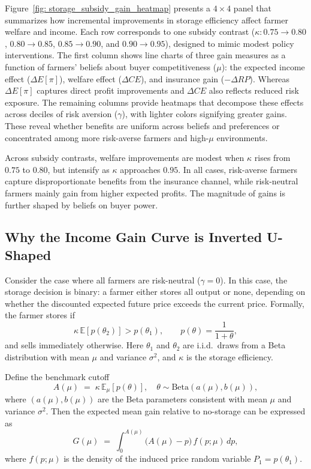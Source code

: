 Figure~\ref{fig: storage_subsidy_gain_heatmap} presents a $4 \times 4$ panel that summarizes how incremental improvements in storage efficiency affect farmer welfare and income. Each row corresponds to one subsidy contrast ($\kappa: 0.75 \rightarrow 0.80$, $0.80 \rightarrow 0.85$, $0.85 \rightarrow 0.90$, and $0.90 \rightarrow 0.95$), designed to mimic modest policy interventions. The first column shows line charts of three gain measures as a function of farmers’ beliefs about buyer competitiveness ($\mu$): the expected income effect ($\Delta E[\pi]$), welfare effect ($\Delta CE$), and insurance gain ($-\Delta RP$). Whereas $\Delta E[\pi]$ captures direct profit improvements and $\Delta CE$ also reflects reduced risk exposure. The remaining columns provide heatmaps that decompose these effects across deciles of risk aversion ($\gamma$), with lighter colors signifying greater gains. These reveal whether benefits are uniform across beliefs and preferences or concentrated among more risk-averse farmers and high-$\mu$ environments.

Across subsidy contrasts, welfare improvements are modest when $\kappa$ rises from $0.75$ to $0.80$, but intensify as $\kappa$ approaches $0.95$. In all cases, risk-averse farmers capture disproportionate benefits from the insurance channel, while risk-neutral farmers mainly gain from higher expected profits. The magnitude of gains is further shaped by beliefs on buyer power. 




\subsection{Why the Income Gain Curve is Inverted U-Shaped}
\noindent
Consider the case where all farmers are risk-neutral ($\gamma=0$). In this case, the storage decision is binary: a farmer either stores all output or none, depending on whether the discounted expected future price exceeds the current price. Formally, the farmer stores if
\[
\kappa\,\mathbb{E}[p(\theta_2)] > p(\theta_1), \qquad p(\theta)=\frac{1}{1+\theta},
\]
and sells immediately otherwise. Here $\theta_1$ and $\theta_2$ are i.i.d.\ draws from a Beta distribution with mean $\mu$ and variance $\sigma^2$, and $\kappa$ is the storage efficiency.

Define the benchmark cutoff
\[
A(\mu) \;=\; \kappa\,\mathbb{E}_{\mu}[p(\theta)], \quad \theta\sim\text{Beta}(a(\mu),b(\mu)),
\]
where $(a(\mu),b(\mu))$ are the Beta parameters consistent with mean $\mu$ and variance $\sigma^2$. Then the expected mean gain relative to no-storage can be expressed as
\[
G(\mu) \;=\; \int_{0}^{A(\mu)} \big(A(\mu)-p\big)\,f(p;\mu)\,dp,
\]
where $f(p;\mu)$ is the density of the induced price random variable $P_1=p(\theta_1)$.

